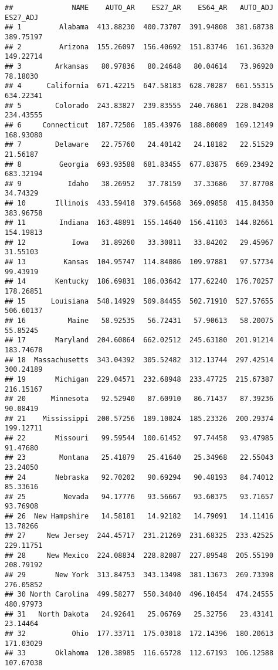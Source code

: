 \documentclass[
]{article}
\begin{document}
\begin{verbatim}
##              NAME    AUTO_AR    ES27_AR    ES64_AR   AUTO_ADJ   ES27_ADJ
## 1         Alabama  413.88230  400.73707  391.94808  381.68738  389.75197
## 2         Arizona  155.26097  156.40692  151.83746  161.36320  149.22714
## 3        Arkansas   80.97836   80.24648   80.04614   73.96920   78.18030
## 4      California  671.42215  647.58183  628.70287  661.55315  634.22341
## 5        Colorado  243.83827  239.83555  240.76861  228.04208  234.43555
## 6     Connecticut  187.72506  185.43976  188.80089  169.12149  168.93080
## 7        Delaware   22.75760   24.40142   24.18182   22.51529   21.56187
## 8         Georgia  693.93588  681.83455  677.83875  669.23492  683.32194
## 9           Idaho   38.26952   37.78159   37.33686   37.87708   34.74329
## 10       Illinois  433.59418  379.64568  369.09858  415.84350  383.96758
## 11        Indiana  163.48891  155.14640  156.41103  144.82661  154.19813
## 12           Iowa   31.89260   33.30811   33.84202   29.45967   31.55103
## 13         Kansas  104.95747  114.84086  109.97881   97.57734   99.43919
## 14       Kentucky  186.69831  186.03642  177.62240  176.70257  178.26851
## 15      Louisiana  548.14929  509.84455  502.71910  527.57655  506.60137
## 16          Maine   58.92535   56.72431   57.90613   58.20075   55.85245
## 17       Maryland  204.60864  662.02512  245.63180  201.91214  183.74678
## 18  Massachusetts  343.04392  305.52482  312.13744  297.42514  300.24189
## 19       Michigan  229.04571  232.68948  233.47725  215.67387  216.15167
## 20      Minnesota   92.52940   87.60910   86.71437   87.39236   90.08419
## 21    Mississippi  200.57256  189.10024  185.23326  200.29374  199.12711
## 22       Missouri   99.59544  100.61452   97.74458   93.47985   91.47680
## 23        Montana   25.41879   25.41640   25.34968   22.55043   23.24050
## 24       Nebraska   92.70202   90.69294   90.48193   84.74012   85.33616
## 25         Nevada   94.17776   93.56667   93.60375   93.71657   93.76908
## 26  New Hampshire   14.58181   14.92182   14.79091   14.11416   13.78266
## 27     New Jersey  244.45717  231.21269  231.68325  233.42525  229.11751
## 28     New Mexico  224.08834  228.82087  227.89548  205.55190  208.79192
## 29       New York  313.84753  343.13498  381.13673  269.73398  276.05852
## 30 North Carolina  499.58277  550.34040  496.10454  474.24555  480.97973
## 31   North Dakota   24.92641   25.06769   25.32756   23.43141   23.14464
## 32           Ohio  177.33711  175.03018  172.14396  180.20613  171.03029
## 33       Oklahoma  120.38985  116.65728  112.67193  106.12588  107.67038

\end{verbatim}
\end{document}
